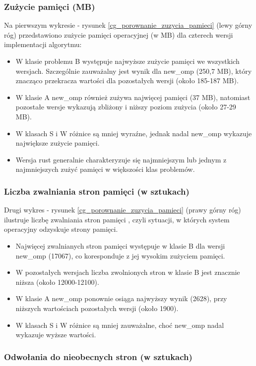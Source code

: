 \subsubsection{Zużycie pamięci (MB)}
Na pierwszym wykresie - rysunek \ref{cg_porownanie_zuzycia_pamieci} (lewy górny róg) przedstawiono zużycie pamięci operacyjnej (w MB) dla czterech wersji implementacji algorytmu:
\begin{itemize}
    \item W klasie problemu B występuje najwyższe zużycie pamięci we wszystkich wersjach. Szczególnie zauważalny jest wynik dla new\_omp (250,7 MB), który znacząco przekracza wartości dla pozostałych wersji (około 185-187 MB).
    \item W klasie A new\_omp również zużywa najwięcej pamięci (37 MB), natomiast pozostałe wersje wykazują zbliżony i niższy poziom zużycia (około 27-29 MB).
    \item W klasach S i W różnice są mniej wyraźne, jednak nadal new\_omp wykazuje największe zużycie pamięci.
    \item Wersja rust generalnie charakteryzuje się najmniejszym lub jednym z najmniejszych zużyć pamięci w większości klas problemów.
\end{itemize}

\subsubsection{Liczba zwalniania stron pamięci (w sztukach)}
Drugi wykres - rysunek \ref{cg_porownanie_zuzycia_pamieci} (prawy górny róg) ilustruje liczbę zwalniania stron pamięci , czyli sytuacji, w których system operacyjny odzyskuje strony pamięci.
\begin{itemize}
    \item Najwięcej zwalnianych stron pamięci występuje w klasie B dla wersji new\_omp (17067), co koresponduje z jej wysokim zużyciem pamięci.
    \item W pozostałych wersjach liczba zwolnionych stron w klasie B jest znacznie niższa (około 12000-12100).
    \item W klasie A new\_omp ponownie osiąga najwyższy wynik (2628), przy niższych wartościach pozostałych wersji (około 1900).
    \item W klasach S i W różnice są mniej zauważalne, choć new\_omp nadal wykazuje wyższe wartości.
\end{itemize}

\subsubsection{Odwołania do nieobecnych stron (w sztukach)}

